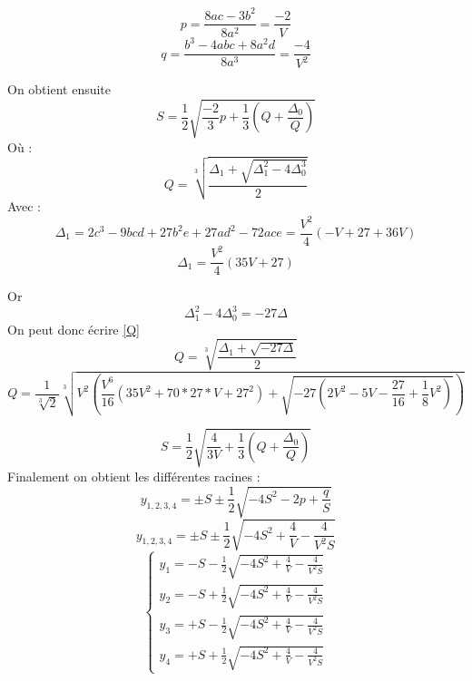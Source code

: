 \documentclass[12pt]{article}
\begin{document}
\begin{equation}
 p = \frac{8ac - 3b^2}{8a^2} = \frac{-2}{V}
\end{equation}
\begin{equation}
 q = \frac{b^3 - 4abc + 8a^2d}{8a^3} = \frac{-4}{V^2}
\end{equation}

On obtient ensuite 
\begin{equation}
S = \frac{1}{2} \sqrt{\frac{-2}{3}p + \frac{1}{3}(Q + \frac{\Delta_0}{Q})}
\end{equation}
O\`u :
\begin{equation}
\label{Q}
Q = \sqrt[3]{\frac{\Delta_1 + \sqrt{\Delta_1^2 - 4 \Delta_0^3}}{2}}
\end{equation}
Avec :
\begin{equation}
 \Delta_1 = 2c^3 - 9bcd + 27b^2e + 27ad^2 - 72ace = \frac{V^2}{4}(-V+27+36V) 
\end{equation}
\begin{equation}
 \Delta_1 = \frac{V^2}{4}(35V +27)
\end{equation}

Or
\begin{equation}
 \Delta_1^2-4\Delta_0^3 = - 27\Delta
\end{equation}
On peut donc \'ecrire \ref{Q}
\begin{equation}
Q =  \sqrt[3]{\frac{\Delta_1+\sqrt{-27\Delta}}{2}}
\end{equation}
\begin{equation}
 Q = \frac{1}{\sqrt[3]{2}}\sqrt[3]{V^2(\frac{V^6}{16}(35V^2+70*27*V+27^2) + \sqrt{-27(2V^2 -5V - \frac{27}{16} + \frac{1}{8}V^2)})}
\end{equation}


\begin{equation}
 S = \frac{1}{2}\sqrt{\frac{4}{3V} + \frac{1}{3}(Q + \frac{\Delta_0}{Q}) }
\end{equation}
Finalement on obtient les diff\'erentes racines :
\begin{equation}
 y_{1,2,3,4} = \pm S \pm \frac{1}{2}\sqrt{-4S^2-2p+\frac{q}{S}}
\end{equation}
\begin{equation}
 y_{1,2,3,4} = \pm S \pm \frac{1}{2}\sqrt{-4S^2+\frac{4}{V}-\frac{4}{V^2 S}}
\end{equation}
\begin{equation}
\left\{ \begin{array}{rl}
y_{1} = - S - \frac{1}{2}\sqrt{-4S^2+\frac{4}{V}-\frac{4}{V^2 S}}\\
y_{2} = - S + \frac{1}{2}\sqrt{-4S^2+\frac{4}{V}-\frac{4}{V^2 S}}\\
y_{3} = + S - \frac{1}{2}\sqrt{-4S^2+\frac{4}{V}-\frac{4}{V^2 S}}\\
y_{4} = + S + \frac{1}{2}\sqrt{-4S^2+\frac{4}{V}-\frac{4}{V^2 S}}
\end{array} \right.
\end{equation} 
\end{document}
